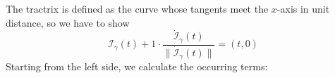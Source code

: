 \documentclass[a4paper,11pt,notitlepage,fullpage]{article}
\DeclareMathOperator{\arccosh}{arccosh}
\begin{document}
\begin{enumerate}
%
The tractrix is defined as the curve whose tangents meet the $x$-axis in unit distance, so we have to show
\begin{equation*}
\mathcal I_\gamma(t) + 1 \cdot \frac{\dot{\mathcal I}_\gamma(t)}{\|\dot{\mathcal I}_\gamma(t)\|} = (t, 0)
\end{equation*}
Starting from the left side, we calculate the occurring terms:

\end{enumerate}
\end{document}
